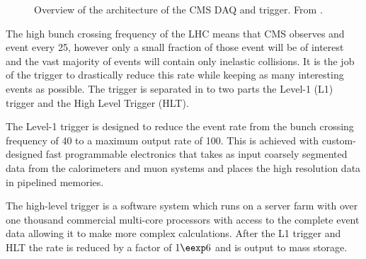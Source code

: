\begin{figure}[htb!]
  \centering
  \caption{Overview of the architecture of the CMS DAQ and trigger. From
  \label{fig:CMSDAQ}
\cite{cms}.}
\end{figure}

The high bunch crossing frequency of the LHC means that CMS observes and event
every \unit{25}{\nano\second}, however only a small fraction of those event
will be of interest and the vast majority of events will contain only inelastic
collisions.
It is the job of the trigger to drastically reduce this rate while keeping as
many interesting events as possible.
The trigger is separated in to two parts the Level-1 (L1) trigger and the High
Level Trigger (HLT).\cite{cms}

The Level-1 trigger is designed to reduce the event rate from the bunch
crossing frequency of \unit{40}{\mega\hertz} to a maximum output rate of
\unit{100}{\kilo\hertz}.
This is achieved with custom-designed fast programmable electronics that takes
as input coarsely segmented data from the calorimeters and muon systems and
places the high resolution data in pipelined memories.

The high-level trigger is a software system which runs on a server farm with
over one thousand commercial multi-core processors with access to the complete
event data allowing it to make more complex calculations. After the L1 trigger
and HLT the rate is reduced by a factor of $1 \eexp 6$ and is output to mass
storage.\cite{cms}

